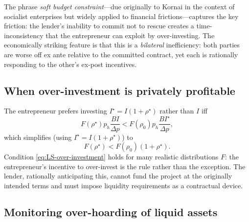 \documentclass[11pt,a4paper,oneside]{book}
\theoremstyle{plain}
\theoremstyle{definition}
\theoremstyle{remark}
\numberwithin{equation}{chapter}
\begin{document}
The phrase \emph{soft budget constraint}---due originally to Kornai in the context of socialist enterprises but widely applied to financial frictions---captures the key friction: the lender's inability to commit not to rescue creates a time-inconsistency that the entrepreneur can exploit by over-investing.
The economically striking feature is that this is a \emph{bilateral} inefficiency: both parties are worse off ex ante relative to the committed contract, yet each is rationally responding to the other's ex-post incentives.

\subsection{When over-investment is privately profitable}

The entrepreneur prefers investing $I^\star = I(1 + \rho^\star)$ rather than $I$ iff
\begin{equation*}
  F(\rho^\star) p_h \frac{B I}{\Delta p} < F(\rho_0) p_h \frac{B I^\star}{\Delta p},
\end{equation*}
which simplifies (using $I^\star = I(1 + \rho^\star)$) to
\begin{equation}\label{eq:LS-over-investment}
  F(\rho^\star) < F(\rho_0)(1 + \rho^\star).
\end{equation}
Condition \eqref{eq:LS-over-investment} holds for many realistic distributions $F$: the entrepreneur's incentive to over-invest is the rule rather than the exception.
The lender, rationally anticipating this, cannot fund the project at the originally intended terms and must impose liquidity requirements as a contractual device.

\subsection{Monitoring over-hoarding of liquid assets}
\end{document}
